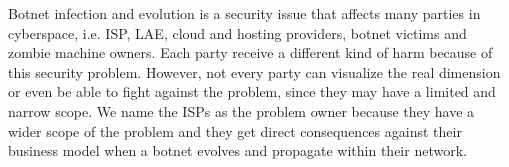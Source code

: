 \label{cap:sec1}
Botnet infection and evolution is a security issue that affects many parties in cyberspace, i.e. ISP, LAE, cloud and hosting providers, botnet victims and zombie machine owners. Each party receive a different kind of harm because of this security problem. However, not every party can visualize the real dimension or even be able to fight against the problem, since they may have a limited and narrow scope. We name the ISPs as the problem owner because they have a wider scope of the problem and they get direct consequences against their business model when a botnet evolves and propagate within their network.

